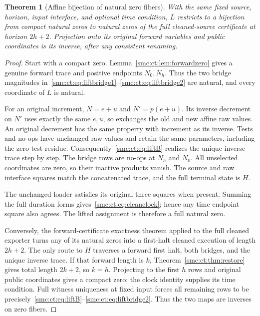 \documentclass[11pt,letterpaper]{article}
\numberwithin{equation}{section}
\newtheorem{theorem}{Theorem}[section]
\theoremstyle{definition}
\theoremstyle{remark}
\begin{document}
\begin{theorem}[Affine bijection of natural zero fibers]\label{smc:ct:thm:lift}
With the same fixed source, horizon, input interface, and optional time condition, $L$ restricts to a bijection from compact natural zeros to natural zeros of the full cleaned-source certificate at horizon $2h+2$. Projection onto its original forward variables and public coordinates is its inverse, after any consistent renaming.
\end{theorem}
\begin{proof}
Start with a compact zero. Lemma~\ref{smc:ct:lem:forwardzero} gives a genuine forward trace and positive endpoints $N_0,N_h$. Thus the two bridge magnitudes in~\eqref{smc:ct:eq:liftbridge1}--\eqref{smc:ct:eq:liftbridge2} are natural, and every coordinate of $L$ is natural.

For an original increment, $N=e+u$ and $N'=p(e+u)$. Its inverse decrement on $N'$ uses exactly the same $e,u$, so exchanges the old and new affine raw values. An original decrement has the same property with increment as its inverse. Tests and no-ops have unchanged raw values and retain the same parameters, including the zero-test residue. Consequently~\eqref{smc:ct:eq:liftB} realizes the unique inverse trace step by step. The bridge rows are no-ops at $N_h$ and $N_0$. All unselected coordinates are zero, so their inactive products vanish. The source and raw interface squares match the concatenated trace, and the full terminal state is $H$.

The unchanged loader satisfies its original three squares when present. Summing the full duration forms gives~\eqref{smc:ct:eq:cleanclock}; hence any time endpoint square also agrees. The lifted assignment is therefore a full natural zero.

Conversely, the forward-certificate exactness theorem applied to the full cleaned exporter turns any of its natural zeros into a first-halt cleaned execution of length $2h+2$. The only route to $H$ traverses a forward first halt, both bridges, and the unique inverse trace. If that forward length is $k$, Theorem~\ref{smc:ct:thm:restore} gives total length $2k+2$, so $k=h$. Projecting to the first $h$ rows and original public coordinates gives a compact zero; the clock identity supplies its time condition. Full witness uniqueness at fixed input forces all remaining rows to be precisely~\eqref{smc:ct:eq:liftB}--\eqref{smc:ct:eq:liftbridge2}. Thus the two maps are inverses on zero fibers.
\end{proof}
\end{document}
